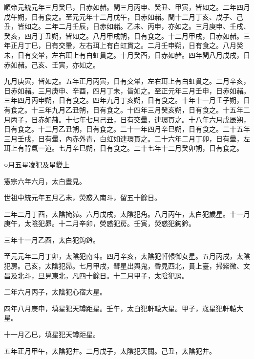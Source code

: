 \begin{pinyinscope}
 順帝元統元年三月癸巳，日赤如赭。閏三月丙申、癸丑、甲寅，皆如之。二年四月戊午朔，日有食之。至元元年十二月戊午，日赤如赭。閏十二月丁亥、戊子、己丑，皆如之。二年二月壬辰，日赤如赭。乙未、丙申，亦如之。三月庚申、壬戌、癸亥，四月丁丑朔，皆如之。八月甲戌朔，日有食之。十二月甲戌，日赤如赭。三年正月丁巳，日有交暈，左右珥上有白虹貫之。二月壬申朔，日有食之。八月癸未，日有交暈，左右珥上有白虹貫之。十月癸酉，日赤如赭。四年閏八月戊戌，日赤如赭。己亥、壬寅，亦如之。



 九月庚寅，皆如之。五年正月丙寅，日有交暈，左右珥上有白虹貫之。二月辛亥，日赤如赭。三月庚申、辛酉，四月丁未，皆如之。至正元年三月壬申，日赤如赭。三年四月丙申朔，日有食之。四年九月丁亥朔，日有食之。十年十一月壬子朔，日有食之。十三年九月乙丑朔，日有食之。十四年三月癸亥朔，日有食之。十五年二月丙子，日赤如赭。十七年七月己丑，日有交暈，連環貫之。十八年六月戊辰朔，日有食之。十二月乙丑朔，日有食之。二十一年四月辛巳朔，日有食之。二十五年三月壬戌，日有暈，內赤外青，白虹如連環貫之。二十六年二月丁卯，日有暈，左珥上有背氣一道。七月辛巳朔，日有食之。二十七年十二月癸卯朔，日有食之。



 ○月五星凌犯及星變上



 憲宗六年六月，太白晝見。



 世祖中統元年五月乙未，熒惑入南斗，留五十餘日。



 二年二月丁酉，太陰掩昴。六月戊戌，太陰犯角。八月丙午，太白犯歲星。十一月庚午，太陰犯昴。十二月辛卯，熒惑犯房。壬寅，熒惑犯鉤鈐。



 三年十一月乙酉，太白犯鉤鈐。



 至元元年二月丁卯，太陰犯南斗。四月辛亥，太陰犯軒轅御女星。五月丙戌，太陰犯房。己亥，太陰犯昴。七月甲戌，彗星出輿鬼，昏見西北，貫上臺，掃紫微、文昌及北斗，旦見東北，凡四十餘日。十二月甲子，太陰犯房。



 二年六月丙子，太陰犯心宿大星。



 四年八月庚申，填星犯天罇距星。壬午，太白犯軒轅大星。甲子，歲星犯軒轅大星。



 十一月乙巳，填星犯天罇距星。



 五年正月甲午，太陰犯井。二月戊子，太陰犯天關。己丑，太陰犯井。




\end{pinyinscope}
